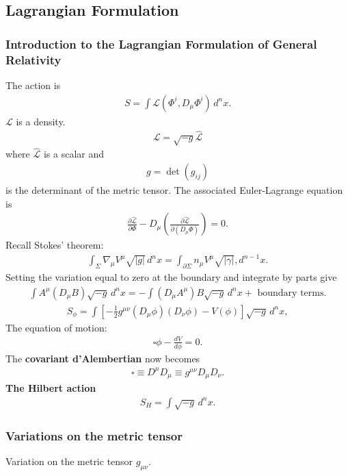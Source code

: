 \documentclass[a4paper,11pt]{article}
\numberwithin{equation}{section}
\theoremstyle{definition}
\newcommand{\p}{\partial}
\newcommand{\lag}{\mathcal{L}}
\begin{document}
\subsection{Lagrangian Formulation}
\subsubsection{Introduction to the Lagrangian Formulation of General Relativity}
The action is
\begin{align}
S = \int \lag (\Phi^i, D_\mu \Phi^i)\,d^nx.
\end{align}
$\lag$ is a density. 
\begin{align}
\lag = \sqrt{-g}\hat{\lag}
\end{align}
where $\hat{\lag}$ is a scalar and
\begin{align*}
g = \det(g_{ij})
\end{align*}
is the determinant of the metric tensor. The associated Euler-Lagrange equation is
\begin{align}
\frac{\p \hat{\lag}}{\p \Phi} - D_\mu \left( \frac{\p \hat{\lag}}{\p (D_\mu \Phi)}\right) = 0.
\end{align}
Recall Stokes' theorem:
\begin{align}
\int_\Sigma \nabla_\mu V^\mu \sqrt{\vert g\vert}\,d^nx = \int_{\p\Sigma} n_\mu V^\mu \sqrt{\vert \gamma \vert},d^{n-1}x.
\end{align}
Setting the variation equal to zero at the boundary and integrate by parts give
\begin{align}
\int A^\mu (D_\mu B)\sqrt{-g}\,d^nx = -\int (D_\mu A^\mu)B\sqrt{-g}\,d^n x + \text{ boundary terms}.
\end{align}
\begin{align}
S_\phi = \int \left[ -\frac{1}{2}g^{\mu\nu}(D_\mu \phi)(D_\nu\phi) - V(\phi) \right]\sqrt{-g}\,d^nx,
\end{align}
The equation of motion:
\begin{align}
\square \phi - \frac{dV}{d\phi} = 0.
\end{align}
The \textbf{covariant d'Alembertian} now becomes
\begin{align}
\square \equiv D^\mu D_\mu \equiv g^{\mu\nu}D_\mu D_\nu.
\end{align}
\textbf{The Hilbert action}
\begin{align}
S_H = \int \sqrt{-g}\,d^nx.
\end{align}
\subsubsection{Variations on the metric tensor}
Variation on the metric tensor $g_{\mu\nu}$.
\end{document}
